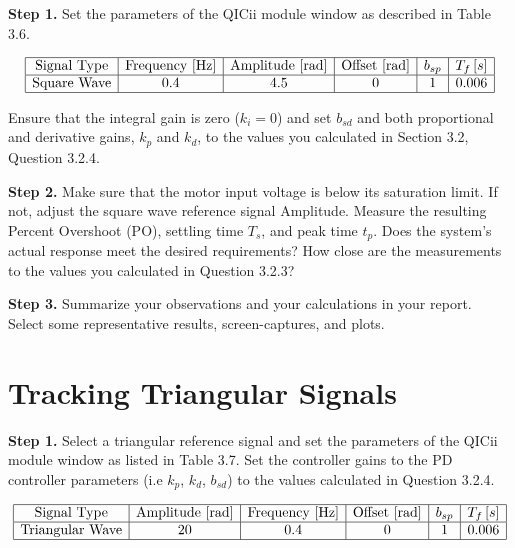 \documentclass{article}
\begin{document}
\textbf{Step 1.} Set the parameters of the QICii module window as described in Table 3.6.

\[
\begin{array}{|c|c|c|c|c|c|}
\hline
\text{Signal Type} & \text{Frequency [Hz]} & \text{Amplitude [rad]} & \text{Offset [rad]} & b_{sp} & T_f \, [s] \\
\hline
\text{Square Wave} & 0.4 & 4.5 & 0 & 1 & 0.006 \\
\hline
\end{array}
\]
\begin{center}
\end{center}

Ensure that the integral gain is zero (\(k_i = 0\)) and set \(b_{sd}\) and both proportional and derivative gains, \(k_p\) and \(k_d\), to the values you calculated in Section 3.2, Question 3.2.4.

\textbf{Step 2.} Make sure that the motor input voltage is below its saturation limit. If not, adjust the square wave reference signal Amplitude. Measure the resulting Percent Overshoot (PO), settling time \(T_s\), and peak time \(t_p\). Does the system's actual response meet the desired requirements? How close are the measurements to the values you calculated in Question 3.2.3?

\textbf{Step 3.} Summarize your observations and your calculations in your report. Select some representative results, screen-captures, and plots.

\section{Tracking Triangular Signals}

\textbf{Step 1.} Select a triangular reference signal and set the parameters of the QICii module window as listed in Table 3.7. Set the controller gains to the PD controller parameters (i.e \(k_p\), \(k_d\), \(b_{sd}\)) to the values calculated in Question 3.2.4.

\[
\begin{array}{|c|c|c|c|c|c|}
\hline
\text{Signal Type} & \text{Amplitude [rad]} & \text{Frequency [Hz]} & \text{Offset [rad]} & b_{sp} & T_f \, [s] \\
\hline
\text{Triangular Wave} & 20 & 0.4 & 0 & 1 & 0.006 \\
\hline
\end{array}
\]
\begin{center}
\end{center}
\end{document}
